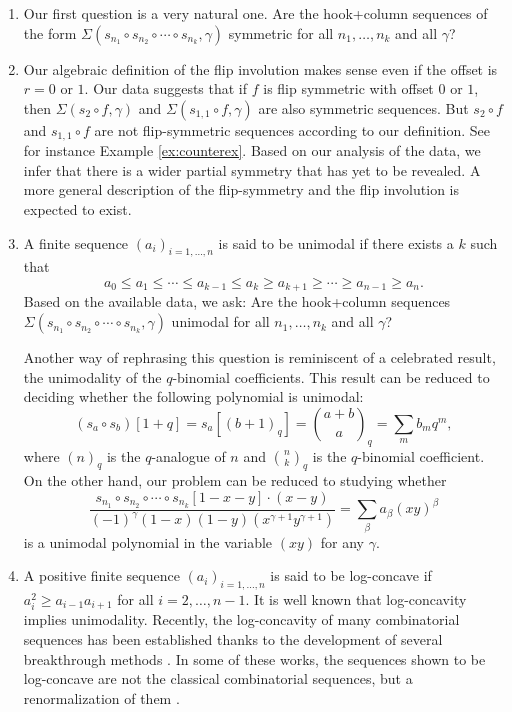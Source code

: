 \documentclass[twoside]{article}
\begin{document}
\begin{enumerate}
\item Our first question is a very natural one. 
Are the hook+column sequences of the form $\Sigma(s_{n_1}\circ s_{n_2}\circ\cdots\circ s_{n_k},\gamma)$ symmetric for all $n_1, \ldots, n_k$ and all  $\gamma$?

\item

Our algebraic definition of the flip involution makes sense even if the offset is $r = 0$ or $1$. Our data suggests that if $f$ is flip symmetric with offset $0$ or $1$, then $\Sigma(s_2\circ f,\gamma)$ and $\Sigma(s_{1,1}\circ f,\gamma)$ are also symmetric sequences. But $s_2\circ f$ and $s_{1,1}\circ f$ are not flip-symmetric sequences according to our definition. See for instance Example \ref{ex:counterex}. Based on our analysis of the data, we infer that there is a wider partial symmetry that has yet to be revealed. A more general description of  the flip-symmetry and the flip involution is expected to exist.


\item
A finite sequence $(a_i)_{i=1, \ldots, n}$ is said to be unimodal  if  there exists a $k$ such that  
\[a_0\le a_1\le \cdots \le a_{k-1} \le a_k \ge a_{k+1} \ge \cdots \ge a_{n-1}\ge a_n.
\]
Based on the available data, we ask:  Are the hook+column sequences $\Sigma(s_{n_1}\circ s_{n_2}\circ\cdots\circ s_{n_k},\gamma)$ {unimodal} for all $n_1, \ldots, n_k$ and all $\gamma$?



Another way of rephrasing this question is reminiscent of a celebrated result, the unimodality of the $q$-binomial coefficients. This result can be reduced to deciding whether the following polynomial is unimodal:
\[(s_a\circ s_b)[1+q] = s_a[(b+1)_q] = \binom{a+b}{a}_q=\sum_m b_m q^m,\]
where $(n)_q$ is the $q$-analogue of $n$ and $\binom{n}{k}_q$ is the $q$-binomial coefficient. On the other hand, our problem can be reduced to studying whether
\[\frac{s_{n_1}\circ s_{n_2}\circ\cdots\circ s_{n_k}[1-x-y]\cdot (x-y)}{(-1)^\gamma(1-x)(1-y)(x^{\gamma+1}y^{\gamma+1})} = \sum_\beta a_\beta(xy)^\beta\]
is a unimodal polynomial in the variable $(xy)$ for any $\gamma$.

\item
A positive finite sequence $(a_i)_{i=1, \ldots, n}$ is said to be log-concave if $a_i^2 \ge a_{i-1}a_{i+1}$ for all $i = 2, \ldots,  n-1$. It is well known that log-concavity implies unimodality. Recently, the log-concavity of many combinatorial sequences has been established thanks to the development of several breakthrough methods \cite{branden14,branden19,baker17,braden20}. In some of these works, the sequences shown to be log-concave are not the classical combinatorial sequences, but a renormalization of them \cite{huh22}.


\end{enumerate}
\end{document}
